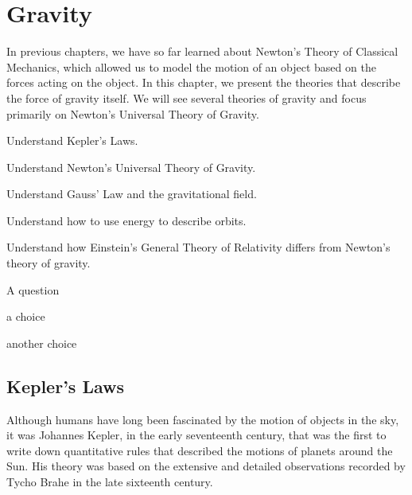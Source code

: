 
\chapter{Gravity}
\label{chapter:gravity}
In previous chapters, we have so far learned about Newton's Theory of Classical Mechanics, which allowed us to model the motion of an object based on the forces acting on the object. In this chapter, we present the theories that describe the force of gravity itself. We will see several theories of gravity and focus primarily on Newton's Universal Theory of Gravity. 

\begin{learningObjectives}{
 \item Understand Kepler's Laws.
 \item Understand Newton's Universal Theory of Gravity. 
 \item Understand Gauss' Law and the gravitational field.
 \item Understand how to use energy to describe orbits.
 \item Understand how Einstein's General Theory of Relativity differs from Newton's theory of gravity.
 }
\end{learningObjectives}

\begin{opening}
\begin{MCquestion}{A question}
\item a choice
\item another choice %
\end{MCquestion}
\end{opening}

\section{Kepler's Laws}
Although humans have long been fascinated by the motion of objects in the sky, it was Johannes Kepler, in the early seventeenth century, that was the first to write down quantitative rules that described the motions of planets around the Sun. His theory was based on the extensive and detailed observations recorded by Tycho Brahe in the late sixteenth century. 

